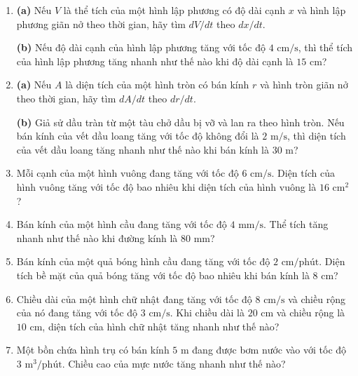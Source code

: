 \noindent
\begin{minipage}[t]{0.482\textwidth}
\fontsize{9pt}{11.4pt}\selectfont
\begin{enumerate}[label=\textbf{\arabic*.}, leftmargin=1.35em, itemsep=0.48em, topsep=0pt, parsep=0pt]
\item \textbf{(a)} Nếu $V$ là thể tích của một hình lập phương có độ dài cạnh $x$ và hình lập phương giãn nở theo thời gian, hãy tìm $dV/dt$ theo $dx/dt$.
\par\smallskip
\textbf{(b)} Nếu độ dài cạnh của hình lập phương tăng với tốc độ $4\text{ cm/s}$, thì thể tích của hình lập phương tăng nhanh như thế nào khi độ dài cạnh là $15\text{ cm}$?

\item \textbf{(a)} Nếu $A$ là diện tích của một hình tròn có bán kính $r$ và hình tròn giãn nở theo thời gian, hãy tìm $dA/dt$ theo $dr/dt$.
\par\smallskip
\textbf{(b)} Giả sử dầu tràn từ một tàu chở dầu bị vỡ và lan ra theo hình tròn. Nếu bán kính của vết dầu loang tăng với tốc độ không đổi là $2\text{ m/s}$, thì diện tích của vết dầu loang tăng nhanh như thế nào khi bán kính là $30\text{ m}$?

\item Mỗi cạnh của một hình vuông đang tăng với tốc độ $6\text{ cm/s}$. Diện tích của hình vuông tăng với tốc độ bao nhiêu khi diện tích của hình vuông là $16\text{ cm}^2$?

\item Bán kính của một hình cầu đang tăng với tốc độ $4\text{ mm/s}$. Thể tích tăng nhanh như thế nào khi đường kính là $80\text{ mm}$?

\item Bán kính của một quả bóng hình cầu đang tăng với tốc độ $2\text{ cm/phút}$. Diện tích bề mặt của quả bóng tăng với tốc độ bao nhiêu khi bán kính là $8\text{ cm}$?

\item Chiều dài của một hình chữ nhật đang tăng với tốc độ $8\text{ cm/s}$ và chiều rộng của nó đang tăng với tốc độ $3\text{ cm/s}$. Khi chiều dài là $20\text{ cm}$ và chiều rộng là $10\text{ cm}$, diện tích của hình chữ nhật tăng nhanh như thế nào?

\item Một bồn chứa hình trụ có bán kính $5\text{ m}$ đang được bơm nước vào với tốc độ $3\text{ m}^3\text{/phút}$. Chiều cao của mực nước tăng nhanh như thế nào?


\end{enumerate}
\end{minipage}
